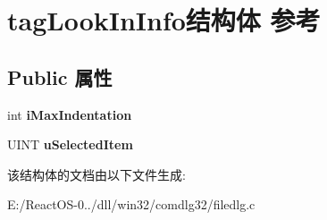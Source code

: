 \hypertarget{structtag_look_in_info}{}\section{tag\+Look\+In\+Info结构体 参考}
\label{structtag_look_in_info}
\subsection*{Public 属性}
\begin{DoxyCompactItemize}
\item 
\mbox{\label{structtag_look_in_info_a9f57bb19ff82cec3dc84436dfc1e7dc1}} 
int {\bfseries i\+Max\+Indentation}
\item 
\mbox{\label{structtag_look_in_info_a931bb29327c77d93697828f2a23ae885}} 
U\+I\+NT {\bfseries u\+Selected\+Item}
\end{DoxyCompactItemize}


该结构体的文档由以下文件生成\+:\begin{DoxyCompactItemize}
\item 
E\+:/\+React\+O\+S-\/0../dll/win32/comdlg32/filedlg.\+c\end{DoxyCompactItemize}
